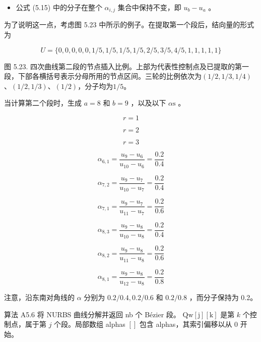 \documentclass[../main.tex]{subfiles}
\begin{document}
\begin{itemize}
\item 公式 (5.15) 中的分子在整个 \({\alpha }_{i,j}\) 集合中保持不变，即 \({u}_{b} - {u}_{a}\) 。
\end{itemize}

为了说明这一点，考虑图 5.23 中所示的例子。在提取第一个段后，结向量的形式为

\[
U = \{ 0,0,0,0,0,1/5,1/5,1/5,1/5,2/5,3/5,4/5,1,1,1,1,1\}
\]



\begin{center}
\begin{minipage}{18cm}
\vspace*{.6\baselineskip}
\centering
{}
\par\smallskip
图 5.23. 四次曲线第二段的节点插入比例。上部为代表性控制点及已提取的第一段，下部各横括号表示分母所用的节点区间。三轮的比例依次为$(1/2,1/3,1/4)$、$(1/2,1/3)$、$(1/2)$，分子均为$1/5$。
\end{minipage}
\end{center}

当计算第二个段时，生成 \(a = 8\) 和 \(b = 9\) ，以及以下 \(\alpha \mathrm{s}\) 。

\[
r = 1
\]

\[
r = 2
\]

\[
r = 3
\]

\[
{\alpha }_{6,1} = \frac{{u}_{9} - {u}_{6}}{{u}_{10} - {u}_{6}} = \frac{0.2}{0.4}
\]

\[
{\alpha }_{7,2} = \frac{{u}_{9} - {u}_{7}}{{u}_{10} - {u}_{7}} = \frac{0.2}{0.4}
\]

\[
{\alpha }_{7,1} = \frac{{u}_{9} - {u}_{7}}{{u}_{11} - {u}_{7}} = \frac{0.2}{0.6}
\]

\[
{\alpha }_{8,3} = \frac{{u}_{9} - {u}_{8}}{{u}_{10} - {u}_{8}} = \frac{0.2}{0.4}
\]

\[
{\alpha }_{8,2} = \frac{{u}_{9} - {u}_{8}}{{u}_{11} - {u}_{8}} = \frac{0.2}{0.6}
\]

\[
{\alpha }_{8,1} = \frac{{u}_{9} - {u}_{8}}{{u}_{12} - {u}_{8}} = \frac{0.2}{0.8}
\]

注意，沿东南对角线的 \(\alpha\) 分别为 \({0.2}/{0.4},{0.2}/{0.6}\) 和 \({0.2}/{0.8}\) ，而分子保持为 0.2。

算法 A5.6 将 NURBS 曲线分解并返回 nb 个 Bézier 段。 \(\mathrm{{Qw}}\left\lbrack  \mathrm{j}\right\rbrack  \left\lbrack  \mathrm{k}\right\rbrack\) 是第 \(k\) 个控制点，属于第 \(j\) 个段。局部数组 alphas \(\left\lbrack  \right\rbrack\) 包含 alphas，其索引偏移以从 0 开始。
\end{document}
